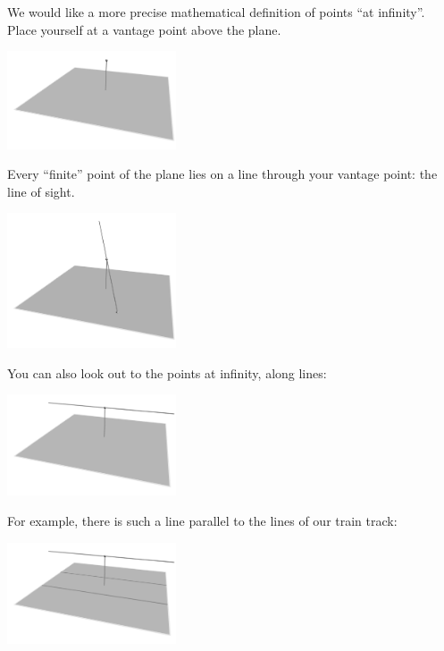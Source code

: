 We would like a more precise mathematical definition of points ``at infinity''.
Place yourself at a vantage point above the plane.
\begin{center}
\includegraphics[width=5cm]{above-the-plane-vantage}
\end{center}
Every ``finite'' point of the plane lies on a line through your vantage point: the line of sight.
\begin{center}
\includegraphics[width=5cm]{above-the-plane-connect}
\end{center}
You can also look out to the points at infinity, along lines:
\begin{center}
\includegraphics[width=5cm]{above-the-plane-off-to-infinity}
\end{center}
For example, there is such a line  parallel to the lines of our train track:
\begin{center}
\includegraphics[width=5cm]{above-the-plane-3}
\end{center}

